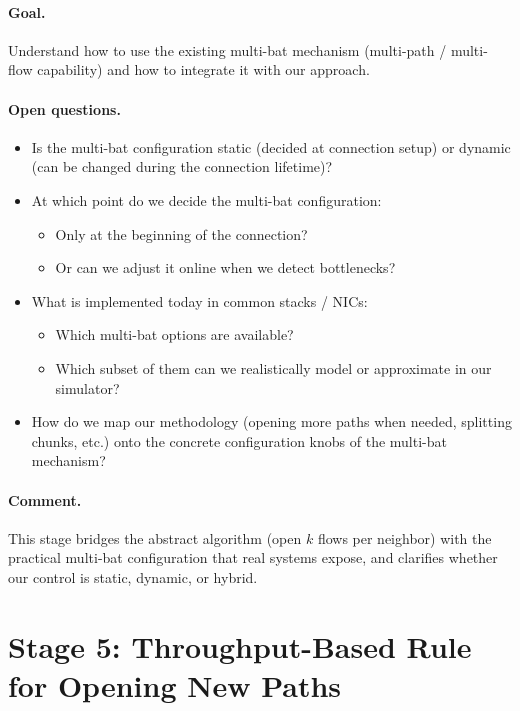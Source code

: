 \documentclass[12pt]{article}
\begin{document}
\paragraph{Goal.}
Understand how to use the existing multi-bat mechanism (multi-path / multi-flow capability) and how to integrate it with our approach.

\paragraph{Open questions.}
\begin{itemize}[leftmargin=*]
  \item Is the multi-bat configuration static (decided at connection setup) or dynamic (can be changed during the connection lifetime)?
  \item At which point do we decide the multi-bat configuration:
        \begin{itemize}
            \item Only at the beginning of the connection?
            \item Or can we adjust it online when we detect bottlenecks?
        \end{itemize}
  \item What is implemented today in common stacks / NICs:
        \begin{itemize}
            \item Which multi-bat options are available?
            \item Which subset of them can we realistically model or approximate in our simulator?
        \end{itemize}
  \item How do we map our methodology (opening more paths when needed, splitting chunks, etc.) onto the concrete configuration knobs of the multi-bat mechanism?
\end{itemize}

\paragraph{Comment.}
This stage bridges the abstract algorithm (open $k$ flows per neighbor) with the practical multi-bat configuration that real systems expose, and clarifies whether our control is static, dynamic, or hybrid.

\newpage
\section*{Stage 5: Throughput-Based Rule for Opening New Paths}
\end{document}
